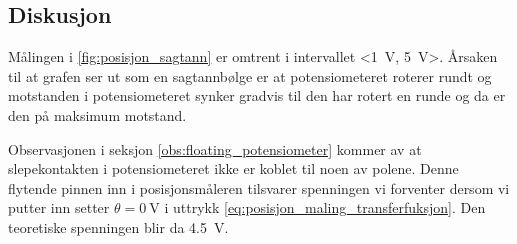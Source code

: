 \subsection{Diskusjon}

Målingen i \autoref{fig:posisjon_sagtann} er omtrent i intervallet <\SI{1}{\volt}, \SI{5}{\volt}>. Årsaken til at grafen ser ut som en sagtannbølge er at potensiometeret roterer rundt og motstanden i potensiometeret synker gradvis til den har rotert en runde og da er den på maksimum motstand.


Observasjonen i seksjon \ref{obs:floating_potensiometer} kommer av at slepekontakten i potensiometeret ikke er koblet til noen av polene. Denne flytende pinnen inn i posisjonsmåleren tilsvarer spenningen vi forventer dersom vi putter inn setter $\theta = \SI{0}{\volt}$ i uttrykk \eqref{eq:posisjon_maling_transferfuksjon}. Den teoretiske spenningen blir da \SI{4.5}{\volt}.
